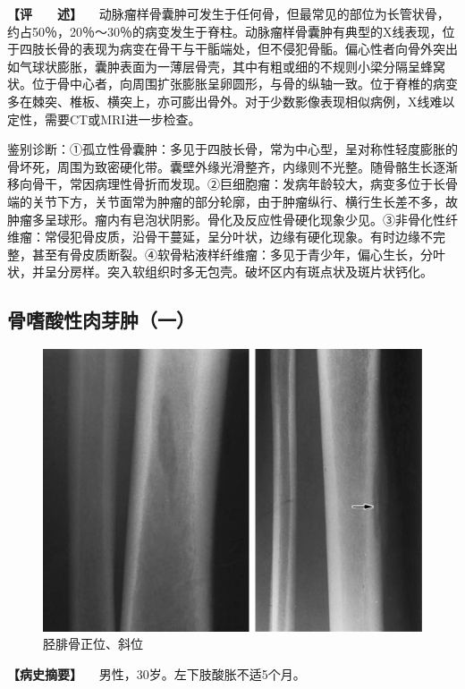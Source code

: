 \textbf{【评　　述】}
　动脉瘤样骨囊肿可发生于任何骨，但最常见的部位为长管状骨，约占50％，20％～30％的病变发生于脊柱。动脉瘤样骨囊肿有典型的X线表现，位于四肢长骨的表现为病变在骨干与干骺端处，但不侵犯骨骺。偏心性者向骨外突出如气球状膨胀，囊肿表面为一薄层骨壳，其中有粗或细的不规则小梁分隔呈蜂窝状。位于骨中心者，向周围扩张膨胀呈卵圆形，与骨的纵轴一致。位于脊椎的病变多在棘突、椎板、横突上，亦可膨出骨外。对于少数影像表现相似病例，X线难以定性，需要CT或MRI进一步检查。

鉴别诊断：①孤立性骨囊肿：多见于四肢长骨，常为中心型，呈对称性轻度膨胀的骨坏死，周围为致密硬化带。囊壁外缘光滑整齐，内缘则不光整。随骨骼生长逐渐移向骨干，常因病理性骨折而发现。②巨细胞瘤：发病年龄较大，病变多位于长骨端的关节下方，关节面常为肿瘤的部分轮廓，由于肿瘤纵行、横行生长差不多，故肿瘤多呈球形。瘤内有皂泡状阴影。骨化及反应性骨硬化现象少见。③非骨化性纤维瘤：常侵犯骨皮质，沿骨干蔓延，呈分叶状，边缘有硬化现象。有时边缘不完整，甚至有骨皮质断裂。④软骨粘液样纤维瘤：多见于青少年，偏心生长，分叶状，并呈分房样。突入软组织时多无包壳。破坏区内有斑点状及斑片状钙化。

\subsection{骨嗜酸性肉芽肿（一）}

\begin{figure}[!htbp]
 \centering
 \includegraphics{./images/Image00111.jpg}
 \captionsetup{justification=centering}
 \caption{胫腓骨正位、斜位}
 \label{fig2-7-26}
  \end{figure} 

\textbf{【病史摘要】} 　男性，30岁。左下肢酸胀不适5个月。

